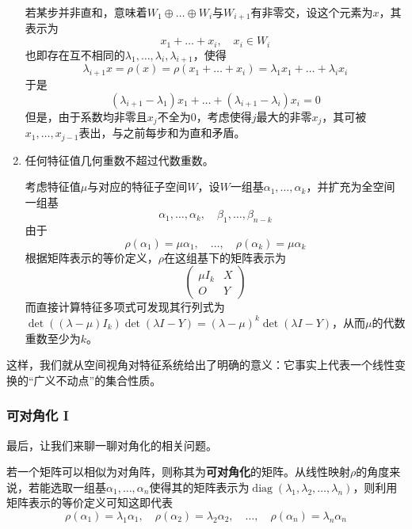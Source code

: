 \documentclass[a4paper,UTF8,fontset=windows]{ctexart}
\DeclareMathOperator{\diag}{diag}
\begin{document}
\begin{enumerate}
    若某步并非直和，意味着$W_1\oplus\dots\oplus W_i$与$W_{i+1}$有非零交，设这个元素为$x$，其表示为
    $$x_1+\dots+x_i,\quad x_i\in W_i$$
    也即存在互不相同的$\lambda_1,\dots,\lambda_i,\lambda_{i+1}$，使得
    $$\lambda_{i+1}x=\rho(x)=\rho(x_1+\dots+x_i)=\lambda_1x_1+\dots+\lambda_ix_i$$
    于是
    $$(\lambda_{i+1}-\lambda_1)x_1+\dots+(\lambda_{i+1}-\lambda_i)x_i=0$$
    但是，由于系数均非零且$x_j$不全为0，考虑使得$j$最大的非零$x_j$，其可被$x_1,\dots,x_{j-1}$表出，与之前每步和为直和矛盾。

    \item 任何特征值几何重数不超过代数重数。
    
    考虑特征值$\mu$与对应的特征子空间$W$，设$W$一组基$\alpha_1,\dots,\alpha_k$，并扩充为全空间一组基
    $$\alpha_1,\dots,\alpha_k,\quad\beta_1,\dots,\beta_{n-k}$$
    由于
    $$\rho(\alpha_1)=\mu\alpha_1,\quad\dots,\quad\rho(\alpha_k)=\mu\alpha_k$$
    根据矩阵表示的等价定义，$\rho$在这组基下的矩阵表示为
    $$\begin{pmatrix}\mu I_k&X\\O&Y\end{pmatrix}$$
    而直接计算特征多项式可发现其行列式为$\det((\lambda-\mu)I_k)\det(\lambda I-Y)=(\lambda-\mu)^k\det(\lambda I-Y)$，从而$\mu$的代数重数至少为$k$。
\end{enumerate}

这样，我们就从空间视角对特征系统给出了明确的意义：它事实上代表一个线性变换的``广义不动点''的集合性质。

\subsubsection{可对角化 I}
最后，让我们来聊一聊对角化的相关问题。

若一个矩阵可以相似为对角阵，则称其为\textbf{可对角化}的矩阵。从线性映射$\rho$的角度来说，若能选取一组基$\alpha_1,\dots,\alpha_n$使得其的矩阵表示为$\diag(\lambda_1,\lambda_2,\dots,\lambda_n)$，则利用矩阵表示的等价定义可知这即代表
$$\rho(\alpha_1)=\lambda_1\alpha_1,\quad\rho(\alpha_2)=\lambda_2\alpha_2,\quad\dots,\quad\rho(\alpha_n)=\lambda_n\alpha_n$$
\end{document}

